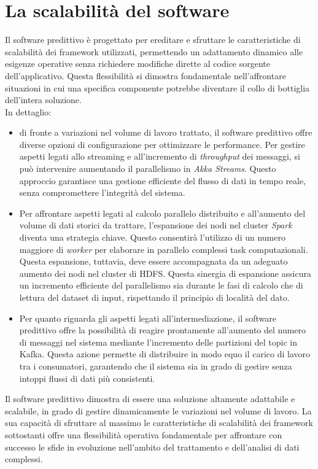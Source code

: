 \section[Scalabilità]{La scalabilità del software}
Il software predittivo è progettato per ereditare e sfruttare le caratteristiche di scalabilità dei framework utilizzati, permettendo un adattamento dinamico alle esigenze operative senza richiedere modifiche dirette al codice sorgente dell'applicativo.
Questa flessibilità si dimostra fondamentale nell'affrontare situazioni in cui una specifica componente potrebbe diventare il collo di bottiglia dell'intera soluzione. \\
In dettaglio: 
\begin{itemize}
    \item di fronte a variazioni nel volume di lavoro trattato, il software predittivo offre diverse opzioni di configurazione per ottimizzare le performance. Per gestire aspetti legati allo streaming e all'incremento di \textit{throughput} dei messaggi, si può intervenire aumentando il parallelismo in \textit{Akka Streams}. Questo approccio garantisce una gestione efficiente del flusso di dati in tempo reale, senza compromettere l'integrità del sistema.
    \item Per affrontare aspetti legati al calcolo parallelo distribuito e all'aumento del volume di dati storici da trattare, l'espansione dei nodi nel cluster \textit{Spark} diventa una strategia chiave. Questo consentirà l'utilizzo di un numero maggiore di \textit{worker} per elaborare in parallelo complessi task computazionali. Questa espansione, tuttavia, deve essere accompagnata da un adeguato aumento dei nodi nel cluster di HDFS. Questa sinergia di espansione assicura un incremento efficiente del parallelismo sia durante le fasi di calcolo che di lettura del dataset di input, rispettando il principio di località del dato.
    \item Per quanto riguarda gli aspetti legati all'intermediazione, il software predittivo offre la possibilità di reagire prontamente all'aumento del numero di messaggi nel sistema mediante l'incremento delle partizioni del topic in Kafka. Questa azione permette di distribuire in modo equo il carico di lavoro tra i consumatori, garantendo che il sistema sia in grado di gestire senza intoppi flussi di dati più consistenti.
\end{itemize}
Il software predittivo dimostra di essere una soluzione altamente adattabile e scalabile, in grado di gestire dinamicamente le variazioni nel volume di lavoro.
La sua capacità di sfruttare al massimo le caratteristiche di scalabilità dei framework sottostanti offre una flessibilità operativa fondamentale per affrontare con successo le sfide in evoluzione nell'ambito del trattamento e dell'analisi di dati complessi.

